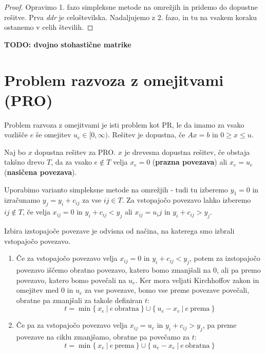 \documentclass[11pt, a4paper]{article}
\begin{document}
    \begin{proof}
        Opravimo 1. fazo simpleksne metode na omrežjih in pridemo do dopustne rešitve. Prva \textit{ddr} je celoštevilska. Nadaljujemo z 2. fazo, in tu na vsakem koraku ostanemo v celih številih.
    \end{proof}

    \textbf{TODO: dvojno stohastične matrike}

    \pagebreak
    \section{Problem razvoza z omejitvami (PRO)}

    Problem razvoza z omejitvami je isti problem kot PR, le da imamo za vsako vozlišče \(e\) še omejitev \(u_e \in [0, \infty)\). Rešitev je dopustna, če \(Ax = b\) in \(0 \ge x \le u\).

    \begin{definition}
        Naj bo \(x\) dopustna rešitev za PRO. \(x\) je drevesna dopustna rešitev, če obstaja takšno drevo \(T\), da za vsako \(e \notin T\) velja \(x_e = 0\) (\textbf{prazna povezava}) ali \(x_e = u_e\) (\textbf{nasičena povezava}).
    \end{definition}

    Uporabimo varianto simpleksne metode na omrežjih - tudi tu izberemo \(y_1 = 0\) in izračunamo \(y_j = y_i + c_{ij}\) za vse \(ij \in T\). Za vstopajočo povezavo lahko izberemo \(ij \notin T\), če velja \(x_{ij} = 0\) in \(y_i + c_{ij} < y_j\) ali \(x_{ij} = u_ij\) in \(y_i + c_{ij} > y_j\).
    \par
    Izbira izstopajoče povezave je odvisna od načina, na katerega smo izbrali vstopajočo povezavo.
    \begin{enumerate}[label=(\alph*)]
        \item Če za vstopajočo povezavo velja \(x_{ij}=0\) in \(y_i+c_{ij} < y_j\), potem za izstopajočo povezavo iščemo obratno povezavo, katero bomo zmanjšali na 0, ali pa premo povezavo, katero bomo povečali na \(u_e\). Ker mora veljati Kirchhoffov zakon in omejitev med 0 in \(u_e\) za vse povezave, bomo vse preme povezave povečali, obratne pa zmanjšali za takole definiran \(t\):
            \[
                t = \min \{\ x_e\ |\ e\ \text{obratna}\ \} \cup \{\ u_e - x_e\ |\ e\ \text{prema}\ \}
            \]
        \item Če pa za vstopajočo povezavo velja \(x_{ij}=u_e\) in \(y_i+c_{ij} > y_j\), pa preme povezave na ciklu zmanjšamo, obratne pa povečamo za \(t\):
            \[
                t = \min \{\ x_e\ |\ e\ \text{prema}\ \} \cup \{\ u_e - x_e\ |\ e\ \text{obratna}\ \}  
            \]
    \end{enumerate}
\end{document}
